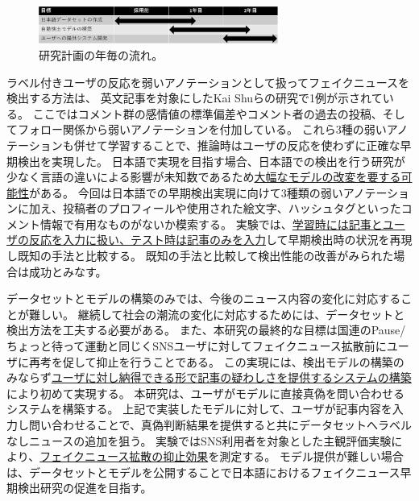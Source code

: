 \setlength\intextsep{0pt}
\setlength\textfloatsep{0pt}
\begin{figure}
    \centering
    \includegraphics[width=0.7\textwidth]{figs/plan.pdf}
    \vspace{-1cm} 
    \caption{研究計画の年毎の流れ。}
    \label{fig:plan}
\end{figure}
ラベル付きユーザの反応を弱いアノテーションとして扱ってフェイクニュースを検出する方法は、
英文記事を対象にしたKai Shuらの研究で1例が示されている\cite{shu2020leveraging}。
ここではコメント群の感情値の標準偏差やコメント者の過去の投稿、そしてフォロー関係から弱いアノテーションを付加している。
これら3種の弱いアノテーションも併せて学習することで、推論時はユーザの反応を使わずに正確な早期検出を実現した。
日本語で実現を目指す場合、日本語での検出を行う研究が少なく言語の違いによる影響が未知数であるため\underline{大幅なモデルの改変を要する可能性}がある。
今回は日本語での早期検出実現に向けて3種類の弱いアノテーションに加え、投稿者のプロフィールや使用された絵文字、ハッシュタグといったコメント情報で有用なものがないか模索する。
実験では、\underline{学習時には記事とユーザの反応を入力に扱い、テスト時は記事のみを入力}して早期検出時の状況を再現し既知の手法と比較する。
既知の手法と比較して検出性能の改善がみられた場合は成功とみなす。

データセットとモデルの構築のみでは、今後のニュース内容の変化に対応することが難しい。
継続して社会の潮流の変化に対応するためには、データセットと検出方法を工夫する必要がある。
また、本研究の最終的な目標は国連のPause/ちょっと待って運動\cite{un}と同じくSNSユーザに対してフェイクニュース拡散前にユーザに再考を促して抑止を行うことである。
この実現には、検出モデルの構築のみならず\underline{ユーザに対し納得できる形で記事の疑わしさを提供するシステムの構築}により初めて実現する。
本研究は、ユーザがモデルに直接真偽を問い合わせるシステムを構築する。
上記で実装したモデルに対して、ユーザが記事内容を入力し問い合わせることで、真偽判断結果を提供すると共にデータセットへラベルなしニュースの追加を狙う。
実験ではSNS利用者を対象とした主観評価実験により、\underline{フェイクニュース拡散の抑止効果}を測定する。
モデル提供が難しい場合は、データセットとモデルを公開することで日本語におけるフェイクニュース早期検出研究の促進を目指す。


